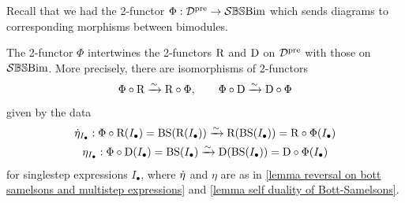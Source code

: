Recall that we had the 2-functor $\Phi: \mathcal{D}^{\operatorname{pre}} \rightarrow \mathcal{S}\mathbb{BS}\text{Bim}$ which sends diagrams to corresponding morphisms between bimodules.
\begin{theorem}\label{thm phi commutes with dual and rev}
    The 2-functor $\Phi$ intertwines the 2-functors $\mathrm{R}$ and $\mathrm{D}$ on $\mathcal{D}^{\operatorname{pre}}$ with those on $\mathcal{S}\mathbb{BS}\text{Bim}$. 
    More precisely, there are isomorphisms of 2-functors 
    \begin{equation}
        \Phi \circ \mathrm{R} \xrightarrow{\sim} \mathrm{R} \circ \Phi, 
        \qquad
        \Phi \circ \mathrm{D} \xrightarrow{\sim} \mathrm{D} \circ \Phi \label{eq phi commutes with rev and dual}
    \end{equation} 
    given by the data
    \begin{gather}
    \dot{\eta}_{I_\bullet}:\Phi \circ \mathrm{R} (I_\bullet)=\operatorname{BS}(\mathrm{R}(I_\bullet)) \xrightarrow{\sim} \mathrm{R}(\operatorname{BS}(I_\bullet))= \mathrm{R}\circ \Phi(I_\bullet)
    \\
    \eta_{I_\bullet}:\Phi \circ \mathrm{D} (I_\bullet)=\operatorname{BS}(I_\bullet) \xrightarrow{\sim} \mathrm{D}(\operatorname{BS}(I_\bullet))=\mathrm{D} \circ \Phi (I_\bullet)
    \end{gather}
    for singlestep expressions $I_\bullet$, where $\dot{\eta}$ and $\eta$  are as in  \cref{lemma reversal on bott samelsons and multistep expressions} and \cref{lemma self duality of Bott-Samelsons}.
\end{theorem}
